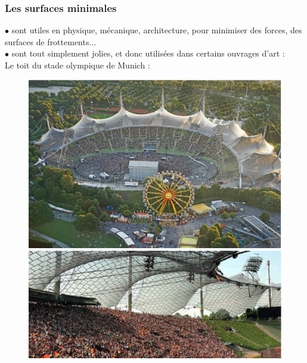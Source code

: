 \documentclass{beamer}
\begin{document}
\begin {frame}
\frametitle{Les surfaces minimales}
$\bullet$ sont utiles en physique, mécanique, architecture, pour minimiser des forces, des surfaces de frottements...\\
\pause 
$\bullet$ sont tout simplement jolies, et donc utilisées dans certains ouvrages d'art : \\
\pause
Le toit du stade olympique de Munich :
\begin{figure}[h!]
   \begin{minipage}[b]{0.45\linewidth}
      \centering\includegraphics[scale=0.25]{stade1.eps}
   \end{minipage}
    \begin{minipage}[b]{0.50\linewidth}   
     \centering\includegraphics[scale=0.30]{stade2.eps}
   \end{minipage}
\end{figure}
\end {frame}
\end{document}

